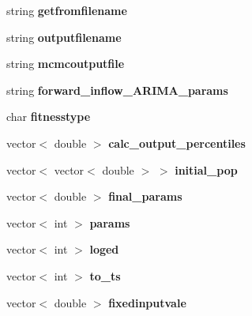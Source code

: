 \begin{DoxyCompactItemize}
\mbox{\label{class_c_g_a_a1c6e763826ee02e7eb8841d1ac7d7f0e}} 
string {\bfseries getfromfilename}
\item 
\mbox{\label{class_c_g_a_a11b430a987bc80c6a8bc9d0f560b0a54}} 
string {\bfseries outputfilename}
\item 
\mbox{\label{class_c_g_a_a5b5172527893804551dc31c58fe88786}} 
string {\bfseries mcmcoutputfile}
\item 
\mbox{\label{class_c_g_a_ab9e5b5492171268e092854ccdd745aec}} 
string {\bfseries forward\+\_\+inflow\+\_\+\+A\+R\+I\+M\+A\+\_\+params}
\item 
\mbox{\label{class_c_g_a_ab19ff0b59643d800a8c479d57770c4d8}} 
char {\bfseries fitnesstype}
\item 
\mbox{\label{class_c_g_a_ab923df9f8d4b349ee19e5cc2f3dedebd}} 
vector$<$ double $>$ {\bfseries calc\+\_\+output\+\_\+percentiles}
\item 
\mbox{\label{class_c_g_a_ae60ace8556ca65257fb85cdabe9688cb}} 
vector$<$ vector$<$ double $>$ $>$ {\bfseries initial\+\_\+pop}
\item 
\mbox{\label{class_c_g_a_a427b9435f8f00c8ef693b41d6c0b0c2c}} 
vector$<$ double $>$ {\bfseries final\+\_\+params}
\item 
\mbox{\label{class_c_g_a_abed70d5c3013061c0296dbda5d7e442c}} 
vector$<$ int $>$ {\bfseries params}
\item 
\mbox{\label{class_c_g_a_a77e50f15285a606df20b35ad3ac08eec}} 
vector$<$ int $>$ {\bfseries loged}
\item 
\mbox{\label{class_c_g_a_ad4b60bc00b7106cac9337babcb6b68ac}} 
vector$<$ int $>$ {\bfseries to\+\_\+ts}
\item 
\mbox{\label{class_c_g_a_a712307be5afa682a2586c49744e43ad4}} 
vector$<$ double $>$ {\bfseries fixedinputvale}
\item 
\mbox{\label{class_c_g_a_ae6c9c3b86881b6e7fea5340670e3467c}} 

\end{DoxyCompactItemize}
